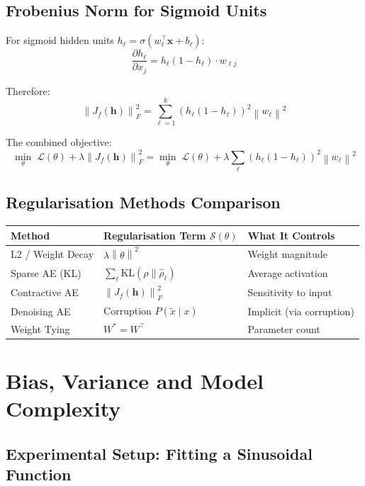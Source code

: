 \documentclass[12pt,a4paper]{article}
\newcommand{\norm}[1]{\left\|#1\right\|}
\newcommand{\vx}{\mathbf{x}}
\newcommand{\vh}{\mathbf{h}}
\newcommand{\Loss}{\mathcal{L}}
\newcommand{\Reg}{\mathcal{S}}
\begin{document}
\subsection{Frobenius Norm for Sigmoid Units}

For sigmoid hidden units $h_\ell = \sigma(w_\ell^\top\vx + b_\ell)$:
\[
\frac{\partial h_\ell}{\partial x_j}
= h_\ell(1-h_\ell)\cdot w_{\ell j}
\]

Therefore:
\[
\norm{J_f(\vh)}_F^2
= \sum_{\ell=1}^{k}(h_\ell(1-h_\ell))^2\norm{w_\ell}^2
\]

The combined objective:
\[
\min_{\theta}\;\Loss(\theta) + \lambda\norm{J_f(\vh)}_F^2
= \min_{\theta}\;\Loss(\theta) + \lambda\sum_\ell(h_\ell(1-h_\ell))^2\norm{w_\ell}^2
\]

\subsection{Regularisation Methods Comparison}

\begin{center}
\begin{tabular}{lll}
\toprule
\textbf{Method} & \textbf{Regularisation Term $\Reg(\theta)$} & \textbf{What It Controls}\\
\midrule
L2 / Weight Decay & $\lambda\norm{\theta}^2$ & Weight magnitude \\
Sparse AE (KL) & $\sum_\ell\text{KL}(\rho\|\hat{\rho}_\ell)$ & Average activation \\
Contractive AE & $\norm{J_f(\vh)}_F^2$ & Sensitivity to input \\
Denoising AE & Corruption $P(\tilde{x}\mid x)$ & Implicit (via corruption) \\
Weight Tying & $W^* = W^\top$ & Parameter count \\
\bottomrule
\end{tabular}
\end{center}

\section{Bias, Variance and Model Complexity}

\subsection{Experimental Setup: Fitting a Sinusoidal Function}
\end{document}
